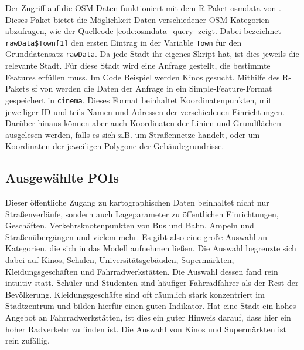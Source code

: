 \documentclass[a4paper,12pt]{thesis}
\begin{document}
Der Zugriff auf die OSM-Daten funktioniert mit dem R-Paket \glqq{}osmdata\grqq{}  von \cite{Padgham2017}. Dieses Paket bietet die Möglichkeit Daten verschiedener OSM-Kategorien abzufragen, wie der Quellcode \ref{code:osmdata_query} zeigt. Dabei bezeichnet \lstinline|rawData$Town[1]| den ersten Eintrag in der Variable \lstinline|Town| für den Grunddatensatz \lstinline|rawData|. Da jede Stadt ihr eigenes Skript hat, ist dies jeweils die relevante Stadt. Für diese Stadt wird eine Anfrage gestellt, die bestimmte Features erfüllen muss. Im Code Beispiel werden Kinos gesucht. Mithilfe des R-Pakets \glqq{}sf\grqq{} von \cite{Pebesma2018} werden die Daten der Anfrage in ein Simple-Feature-Format gespeichert in \lstinline|cinema|. Dieses Format beinhaltet Koordinatenpunkten, mit jeweiliger ID und teils Namen und Adressen der verschiedenen Einrichtungen. Darüber hinaus können aber auch Koordinaten der Linien und Grundflächen ausgelesen werden, falls es sich z.B. um Straßennetze handelt, oder um Koordinaten der jeweiligen Polygone der Gebäudegrundrisse.


\subsection{Ausgewählte POIs}

Dieser öffentliche Zugang zu kartographischen Daten beinhaltet nicht nur Straßenverläufe, sondern auch Lageparameter zu öffentlichen Einrichtungen, Geschäften, Verkehrsknotenpunkten von Bus und Bahn, Ampeln und Straßenübergängen und vielem mehr. Es gibt also eine große Auswahl an Kategorien, die sich in das Modell aufnehmen ließen. Die Auswahl begrenzte sich dabei auf Kinos, Schulen, Universitätsgebäuden, Supermärkten, Kleidungsgeschäften und Fahrradwerkstätten. Die Auswahl dessen fand rein intuitiv statt. Schüler und Studenten sind häufiger Fahrradfahrer als der Rest der Bevölkerung. Kleidungsgeschäfte sind oft räumlich stark konzentriert im Stadtzentrum und bilden hierfür einen guten Indikator. Hat eine Stadt ein hohes Angebot an Fahrradwerkstätten, ist dies ein guter Hinweis darauf, dass hier ein hoher Radverkehr zu finden ist. Die Auswahl von Kinos und Supermärkten ist rein zufällig.\\
\end{document}
